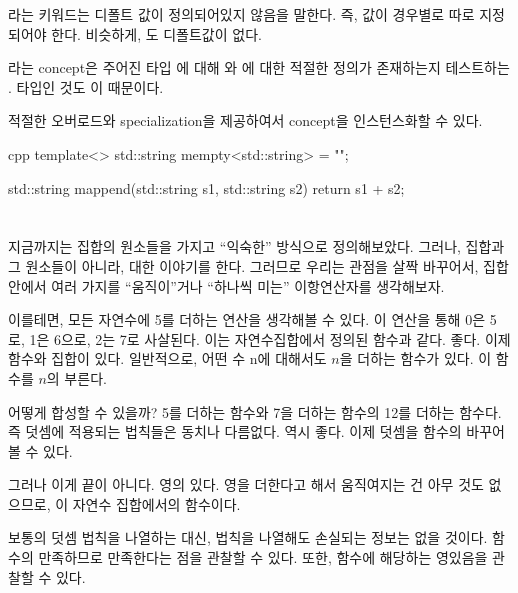 라는 키워드는 디폴트 값이 정의되어있지 않음을 말한다. 
즉, 값이 경우별로 따로 지정되어야 한다.
비슷하게, 도 디폴트값이 없다.

라는 concept은 
주어진 타입 에 대해 와 에 대한 적절한 정의가 존재하는지 테스트하는 .
 타입인 것도 이 때문이다.

적절한 오버로드와 specialization을 제공하여서 \trMonoid concept을 인스턴스화할 수 있다.

\begin{snip}{cpp}
template<>
std::string mempty<std::string> = {""};

std::string mappend(std::string s1, std::string s2) { 
    return s1 + s2;
}
\end{snip}

\section{ \trMonoid }

지금까지는 집합의 원소들을 가지고 ``익숙한'' 방식으로  정의해보았다. 
그러나,  집합과 그 원소들이 아니라,   대한 이야기를 한다.
그러므로 우리는 관점을 살짝 바꾸어서, 집합 안에서 여러 가지를 ``움직이''거나 ``하나씩 미는'' 이항연산자를 생각해보자.

이를테면, 모든 자연수에 5를 더하는 연산을 생각해볼 수 있다. 이 연산을 통해 0은 5로, 1은 6으로, 2는 7로 사살된다.
이는 자연수집합에서 정의된 함수과 같다. 좋다. 이제 함수와 집합이 있다. 
일반적으로, 어떤 수 n에 대해서도 $n$을 더하는 함수가 있다. 이 함수를 $n$의  부른다.

 어떻게 합성할 수 있을까? 5를 더하는 함수와 7을 더하는 함수의  12를 더하는 함수다.
즉   덧셈에 적용되는 법칙들은 동치나 다름없다. 역시 좋다. 이제 덧셈을 함수의  바꾸어 볼 수 있다.

그러나 이게 끝이 아니다.  영의  있다. 영을 더한다고 해서 움직여지는 건 아무 것도 없으므로,
이  자연수 집합에서의 \trIdentity 함수이다.

보통의 덧셈 법칙을 나열하는 대신,  법칙을 나열해도 손실되는 정보는 없을 것이다.
함수의   만족하므로    만족한다는 점을 관찰할 수 있다.
또한, \trIdentity 함수에 해당하는 영 있음을 관찰할 수 있다.

